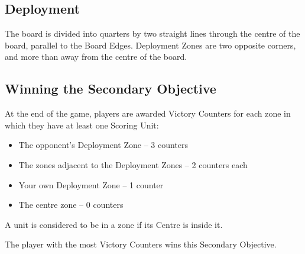
\label{DominatingTheField}


\subsection*{Deployment}

The board is divided into quarters by two straight lines through the centre of the board, parallel to the Board Edges. Deployment Zones are two opposite corners, and more than  away from the centre of the board.


\subsection*{Winning the Secondary Objective}

At the end of the game, players are awarded Victory Counters for each zone in which they have at least one Scoring Unit:

\begin{itemize}
\item The opponent's Deployment Zone -- 3 counters
\item The zones adjacent to the Deployment Zones -- 2 counters each
\item Your own Deployment Zone -- 1 counter
\item The centre zone -- 0 counters
\end{itemize}

A unit is considered to be in a zone if its Centre is inside it.

The player with the most Victory Counters wins this Secondary Objective.

